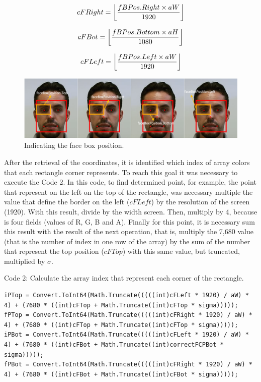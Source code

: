 \documentclass[10pt, conference]{IEEEtran}
\DeclarePairedDelimiter\floor{\lfloor}{\rfloor}
\begin{document}
    \begin{equation}
		cFRight=\floor*{\frac{fBPos.Right \times aW}{1920}}
	\end{equation}
    
    \begin{equation}
		cFBot=\floor*{\frac{fBPos.Bottom \times aH}{1080}}
	\end{equation}
    
    \begin{equation}
		cFLeft=\floor*{\frac{fBPos.Left \times aW}{1920}}
		\label{eq:pt4}
	\end{equation}


    \begin{figure}[t]
        \centering
        \includegraphics{figures/pic12.png}
        \caption{Indicating the face box position.}
        \label{fig:fig12}
    \end{figure}

	After the retrieval of the coordinates, it is identified which index of array colors that each rectangle corner represents.
	To reach this goal it was necessary to execute the Code 2. 
	In this code, to find determined point, for example, the point that represent on the left on the top of the rectangle, was necessary multiple the value that define the border on the left ($cFLeft$) by the resolution of the screen (1920). 
	With this result, divide by the width screen. Then, multiply by 4, because is four fields (values of R, G, B and A). 
	Finally for this point, it is necessary sum this result with the result of the next operation, that is, multiply the 7,680 value (that is the number of index in one row of the array) by the sum of the number that represent the top position ($cFTop$) with this same value, but truncated, multiplied by $\sigma$.

Code 2: Calculate the array index that represent each corner of the rectangle.
\begin{lstlisting}
iPTop = Convert.ToInt64(Math.Truncate(((((int)cFLeft * 1920) / aW) * 4) + (7680 * ((int)cFTop + Math.Truncate((int)cFTop * sigma)))));
fPTop = Convert.ToInt64(Math.Truncate(((((int)cFRight * 1920) / aW) * 4) + (7680 * ((int)cFTop + Math.Truncate((int)cFTop * sigma)))));
iPBot = Convert.ToInt64(Math.Truncate(((((int)cFLeft * 1920) / aW) * 4) + (7680 * ((int)cFBot + Math.Truncate((int)correctFCPBot * sigma)))));
fPBot = Convert.ToInt64(Math.Truncate(((((int)cFRight * 1920) / aW) * 4) + (7680 * ((int)cFBot + Math.Truncate((int)cFBot * sigma)))));
\end{lstlisting}
\end{document}

